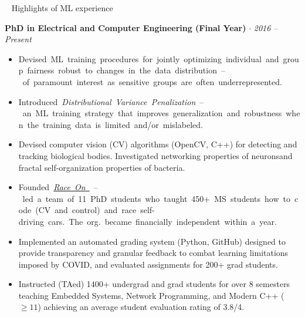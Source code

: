 \documentclass[11pt]{article}
\makeatletter
\newcommand{\hl}[1]{%
    \setbox\@tempboxa\hbox{#1}%
    \ifdim\wd\@tempboxa>\linewidth
    \noindent
    \fcolorbox{black}{white}{%
        \parbox[m]{\dimexpr\linewidth-2\fboxsep}{{\large \onehalfspacing #1}}
          
    }%
    \else
    \fcolorbox{black}{white}{#1}%
    \fi
}%
\newcommand{\checkthis}{{\small \faIcon{star}}}
\makeatother
\begin{document}
\begin{flushright}
    \checkthis~\!\! {\small Highlights of ML experience}
\end{flushright}
\vspace{-6mm}
%
%
\hphantom{Work Experience}\newline
\textbf{ PhD in Electrical and Computer Engineering (Final Year)} \enskip $\cdot$  \hfill \textit{\footnotesize 2016 -- Present} 
\begin{rightrule}
\begin{itemize}[left=5pt]
    \item[\checkthis] \hl{Devised ML training procedures for jointly optimizing individual and group fairness robust to changes in the data distribution -- of paramount interest as sensitive groups are often underrepresented.\footnotemark[1]}

    \item[\checkthis] \hl{Introduced \textit{Distributional Variance Penalization} -- an ML training strategy that improves generalization and robustness when the training data is limited and/or mislabeled.\footnotemark[2]}
    
    \item Devised computer vision (CV) algorithms (OpenCV, C++) for detecting and tracking biological bodies. Investigated networking properties of neurons\footnotemark[3] and fractal self-organization properties of bacteria.\footnotemark[4]
    
    \item[\checkthis] \hl{Founded \href{http://raceon.io/}{\textit{Race On} \scriptsize \faIcon{external-link-alt}} -- led a team of 11 PhD students who taught 450+ MS students how to code (CV and control) and race self-driving cars. The org. became financially independent within a year.}
    \item Implemented an automated grading system (Python, GitHub) designed to provide transparency and granular feedback to combat learning limitations imposed by COVID, and evaluated assignments for 200+ grad students.
    \item Instructed (TAed) 1400+ undergrad and grad students for over 8 semesters teaching Embedded Systems, Network Programming, and Modern C++ ($\geq 11$) achieving an average student evaluation rating of 3.8/4.
    

\end{itemize}
\end{rightrule}
\end{document}
